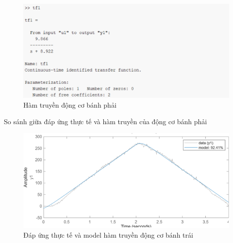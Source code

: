                \begin{figure}[H]
                    \centering
                    \includegraphics[width=1\textwidth]{pictures/chapter5/CJGB1_tf.png}
                    \caption{Hàm truyền động cơ bánh phải}
                    \label{CJGB1_tf}
               \end{figure} 
               \hspace*{0.6cm}So sánh giữa đáp ứng thực tế và hàm truyền của động cơ bánh phải
               \begin{figure}[H]
                    \centering
                    \includegraphics[width=1\textwidth]{pictures/chapter5/CJGB1_compare.png}
                    \caption{Đáp ứng thực tế và model hàm truyền động cơ bánh trái}
                    \label{CJGB1_compare}
               \end{figure} 
